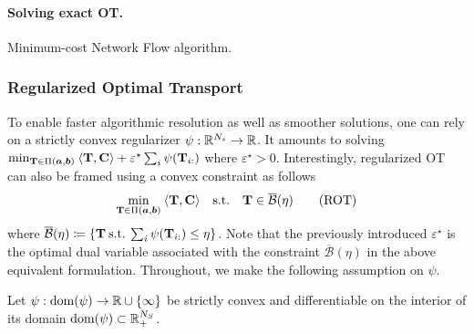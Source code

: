 \paragraph{Solving exact OT.} Minimum-cost Network Flow algorithm. 





\subsubsection{Regularized Optimal Transport}

To enable faster algorithmic resolution as well as smoother solutions, one can rely on a strictly convex regularizer $\psi : \mathbb{R}^{N_s} \to \mathbb{R}$. It amounts to solving $\min_{{\mathbf{T}} \in \Pi(\bm{a}, \bm{b})} \: \langle {\mathbf{T}}, \mathbf{C} \rangle + \varepsilon^\star \sum_i \psi({\mathbf{T}}_{i:})$ where $\varepsilon^\star > 0$. 
Interestingly, regularized OT can also be framed using a convex constraint as follows
\begin{align}\label{eq:cot}
    \min_{{\mathbf{T}} \in \Pi(\bm{a}, \bm{b})} \: \langle {\mathbf{T}}, {\mathbf{C}} \rangle \quad \text{s.t.} \quad  {\mathbf{T}} \in \overline{\mathcal{B}}(\eta)
    \tag{ROT}
\end{align}
where $\overline{\mathcal{B}}(\eta) \coloneqq \{ {\mathbf{T}} \: \text{s.t.} \: \sum_i \psi({\mathbf{T}}_{i:}) \leq \eta \}$. Note that the previously introduced $\varepsilon^\star$ is the optimal dual variable associated with the constraint $\overline{\mathcal{B}}(\eta)$ in the above equivalent formulation. 
Throughout, we make the following assumption on $\psi$.
\begin{assumption}\label{assumption_psi}
    Let $\psi: \mathrm{dom}(\psi) \to \mathbb{R} \cup \{\infty\}$ be strictly convex and differentiable on the interior of its domain $\mathrm{dom}(\psi) \subset \mathbb{R}^{N_S}_+$.
\end{assumption}

